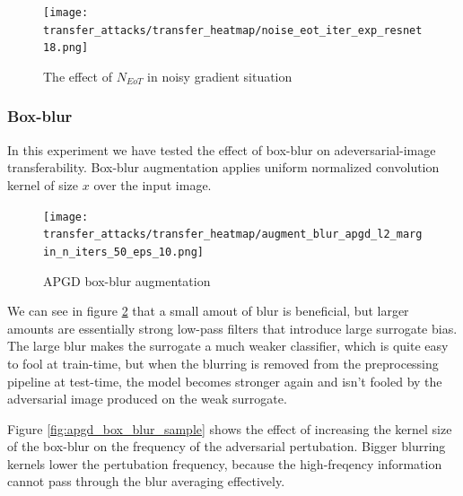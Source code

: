 \begin{figure}
    \centering
    \texttt{[image: transfer\_attacks/transfer\_heatmap/noise\_eot\_iter\_exp\_resnet18.png]}
    \caption{The effect of $N_{EoT}$ in noisy gradient situation}
    \label{fig:noise_eot_iter}
\end{figure}



\subsubsection{Box-blur}
In this experiment we have tested the effect of box-blur on adeversarial-image transferability. Box-blur augmentation applies uniform normalized convolution kernel of size $x$ over the input image. 

\begin{figure}
    \centering
    \texttt{[image: transfer\_attacks/transfer\_heatmap/augment\_blur\_apgd\_l2\_margin\_n\_iters\_50\_eps\_10.png]}
    \caption{APGD box-blur augmentation}
    \label{fig:apgd_box_blur}
\end{figure}

We can see in figure \ref{fig:apgd_box_blur} that a small amout of blur is beneficial, but larger amounts are essentially strong low-pass filters that introduce large surrogate bias. The large blur makes the surrogate a much weaker classifier, which is quite easy to fool at train-time, but when the blurring is removed from the preprocessing pipeline at test-time, the model becomes stronger again and isn't fooled by the adversarial image produced on the weak surrogate.

Figure \ref{fig:apgd_box_blur_sample} shows the effect of increasing the kernel size of the box-blur on the frequency of the adversarial pertubation. Bigger blurring kernels lower the pertubation frequency, because the high-freqency information cannot pass through the blur averaging effectively.


